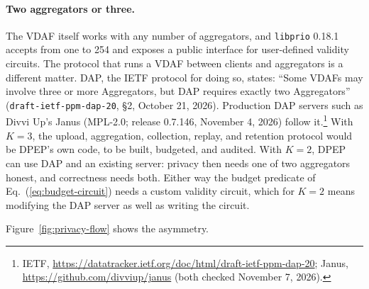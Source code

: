 \documentclass[10pt,twoside,openany]{book}
\theoremstyle{dpepstyle}
\begin{document}
\paragraph{Two aggregators or three.} The VDAF itself works with any number of aggregators, and \texttt{libprio} 0.18.1 accepts from one to 254 and exposes a public interface for user-defined validity circuits. The protocol that runs a VDAF between clients and aggregators is a different matter. DAP, the IETF protocol for doing so, states: ``Some VDAFs may involve three or more Aggregators, but DAP requires exactly two Aggregators'' (\texttt{draft-ietf-ppm-dap-20}, \S 2, October 21, 2026). Production DAP servers such as Divvi Up's Janus (MPL-2.0; release 0.7.146, November 4, 2026) follow it.\footnote{IETF, \url{https://datatracker.ietf.org/doc/html/draft-ietf-ppm-dap-20}; Janus, \url{https://github.com/divviup/janus} (both checked November 7, 2026).} With $K=3$, the upload, aggregation, collection, replay, and retention protocol would be DPEP's own code, to be built, budgeted, and audited. With $K=2$, DPEP can use DAP and an existing server: privacy then needs one of two aggregators honest, and correctness needs both. Either way the budget predicate of Eq.~(\ref{eq:budget-circuit}) needs a custom validity circuit, which for $K=2$ means modifying the DAP server as well as writing the circuit.

Figure~\ref{fig:privacy-flow} shows the asymmetry.
\end{document}
